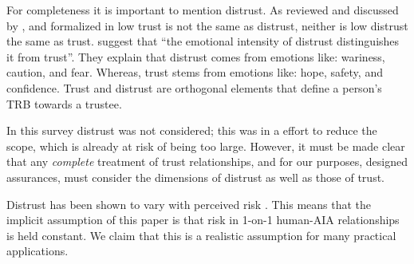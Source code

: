     For completeness it is important to mention distrust. As reviewed and discussed by \citet{Lewicki1998-ox}, and formalized in \cite{McKnight2001-hm,McKnight2001-gz} low trust is not the same as distrust, neither is low distrust the same as trust. \citet{McKnight2001-gz} suggest that ``the emotional intensity of distrust distinguishes it from trust''. They explain that distrust comes from emotions like: wariness, caution, and fear. Whereas, trust stems from emotions like: hope, safety, and confidence. Trust and distrust are orthogonal elements that define a person's TRB towards a trustee. %
%



    In this survey distrust was not considered; this was in a effort to reduce the scope, which is already at risk of being too large. However, it must be made clear that any \emph{complete} treatment of trust relationships, and for our purposes, designed assurances, must consider the dimensions of distrust as well as those of trust. 
    
    Distrust has been shown to vary with perceived risk \cite{McKnight2004-vv}. This means that the implicit assumption of this paper is that risk in 1-on-1 human-AIA relationships is held constant. We claim that this is a realistic assumption for many practical applications.

